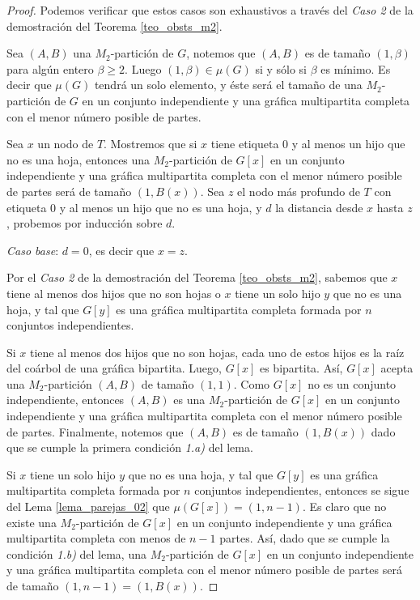 \begin{proof}

Podemos verificar que estos casos son exhaustivos a través del \emph{Caso 2} de la demostración del Teorema \ref{teo_obsts_m2}.

Sea $(A,B)$ una $M_2$-partición de $G$, notemos que $(A,B)$ es de tamaño $(1,\beta)$ para algún entero $\beta \geq 2$. Luego $(1,\beta)\in \mu(G)$ si y sólo si $\beta$ es mínimo. Es decir que $\mu(G)$ tendrá un solo elemento, y éste será el tamaño de una $M_2$-partición de $G$ en un conjunto independiente y una gráfica multipartita completa con el menor número posible de partes.

Sea $x$ un nodo de $T$. Mostremos que si $x$ tiene etiqueta 0 y al menos un hijo que no es una hoja, entonces una $M_2$-partición de $G[x]$ en un conjunto independiente y una gráfica multipartita completa con el menor número posible de partes será de tamaño $(1,B(x))$. Sea $z$ el nodo más profundo de $T$ con etiqueta 0 y al menos un hijo que no es una hoja, y $d$ la distancia desde $x$ hasta $z$, probemos por inducción sobre $d$.

\emph{Caso base}: $d = 0$, es decir que $x = z$.

Por el \emph{Caso 2} de la demostración del Teorema \ref{teo_obsts_m2}, sabemos que $x$ tiene al menos dos hijos que no son hojas o $x$ tiene un solo hijo $y$ que no es una hoja, y tal que $G[y]$ es una gráfica multipartita completa formada por $n$ conjuntos independientes.

Si $x$ tiene al menos dos hijos que no son hojas, cada uno de estos hijos es la raíz del coárbol de una gráfica bipartita. Luego, $G[x]$ es bipartita. Así, $G[x]$ acepta una $M_2$-partición $(A,B)$ de tamaño $(1,1)$. Como $G[x]$ no es un conjunto independiente, entonces $(A,B)$ es una $M_2$-partición de $G[x]$ en un conjunto independiente y una gráfica multipartita completa con el menor número posible de partes. Finalmente, notemos que $(A,B)$ es de tamaño $(1,B(x))$ dado que se cumple la primera condición \emph{1.a)} del lema.

Si $x$ tiene un solo hijo $y$ que no es una hoja, y tal que $G[y]$ es una gráfica multipartita completa formada por $n$ conjuntos independientes, entonces se sigue del Lema \ref{lema_parejas_02} que $\mu(G[x]) = (1,n-1)$. Es claro que no existe una $M_2$-partición de $G[x]$ en un conjunto independiente y una gráfica multipartita completa con menos de $n-1$ partes. Así, dado que se cumple la condición \emph{1.b)} del lema, una $M_2$-partición de $G[x]$ en un conjunto independiente y una gráfica multipartita completa con el menor número posible de partes será de tamaño $(1,n-1)=(1,B(x))$.


\end{proof}
